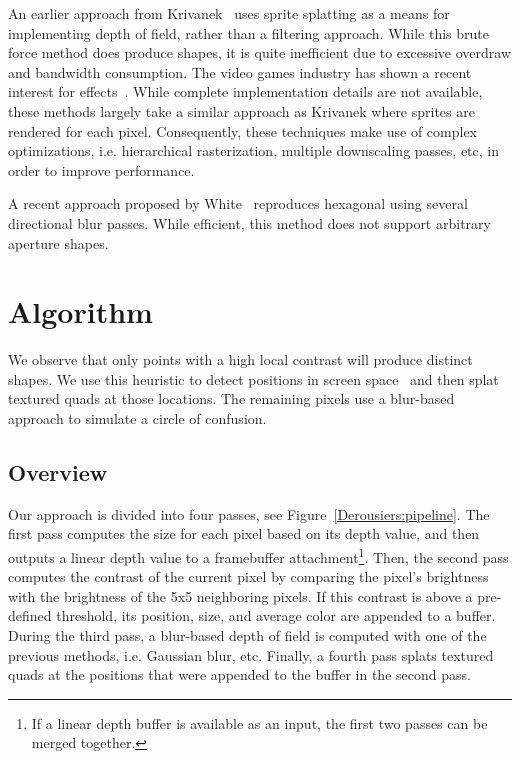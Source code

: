 An earlier approach from Krivanek~\cite{Krivanek03} uses sprite splatting as a means for implementing depth of field, rather than a filtering approach. While this brute force method does produce \bokeh shapes, it is quite inefficient due to excessive overdraw and bandwidth consumption. The video games industry has shown a recent interest for \bokeh effects~\cite{Capcom07,Sousa11,Futurmark11,Mittring11}. While complete implementation details are not available, these methods largely take a similar approach as Krivanek where sprites are rendered for each pixel. Consequently, these techniques make use of complex optimizations, i.e. hierarchical rasterization, multiple downscaling passes, etc, in order to improve performance. 

A recent approach proposed by White~\cite{White11} reproduces hexagonal \bokeh using several directional blur passes. While efficient, this method does not support arbitrary aperture shapes.

\section{Algorithm}
We observe that only points with a high local contrast will produce distinct \bokeh shapes. We use this heuristic to detect \bokeh positions in screen space~\cite{Pettineo11} and then splat textured quads at those locations. The remaining pixels use a blur-based approach to simulate a circle of confusion.

\subsection{Overview}
Our approach is divided into four passes, see Figure~\ref{Derousiers:pipeline}. The first pass computes the \coc size for each pixel based on its depth value, and then outputs a linear depth value to a framebuffer attachment\footnote{If a linear depth buffer is available as an input, the first two passes can be merged together.}. Then, the second pass computes the contrast of the current pixel by comparing the pixel's brightness with the brightness of the 5x5 neighboring pixels. If this contrast is above a pre-defined threshold, its position, \coc size, and average color are appended to a buffer. During the third pass, a blur-based depth of field is computed with one of the previous methods, i.e. Gaussian blur, etc. Finally, a fourth pass splats textured quads at the \bokeh positions that were appended to the buffer in the second pass.

